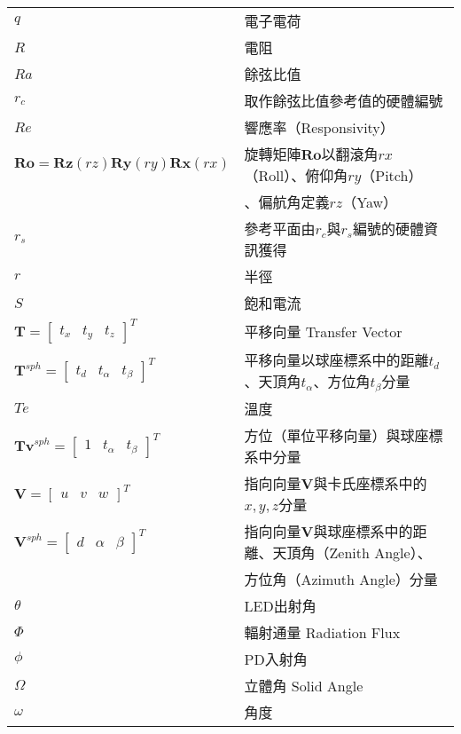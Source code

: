 \begin{longtable}[l]{ll}
    $q$&電子電荷\\

    $R$&電阻\\
    $Ra$& 餘弦比值\\
    $r_c$& 取作餘弦比值參考值的硬體編號\\
    $Re$ & 響應率（Responsivity）\\
    $\boldsymbol{Ro}=\boldsymbol{Rz}(rz)\boldsymbol{Ry}(ry)\boldsymbol{Rx}(rx)$ & 
        旋轉矩陣$\boldsymbol{Ro}$以翻滾角$rx$（Roll）、俯仰角$ry$（Pitch）\\
        & 、偏航角定義$rz$（Yaw）\\%
    $r_s$& 參考平面由$r_c$與$r_s$編號的硬體資訊獲得\\

    $r$ & 半徑\\

    $S$ &飽和電流\\

    $\boldsymbol{T}=\left[\begin{array}{ccc}t_x&t_y&t_z\end{array}\right]^T$ & 平移向量 Transfer Vector\\
    $\boldsymbol{T}^{sph}=\left[\begin{array}{ccc}t_d&t_{\alpha}&t_{\beta}\end{array}\right]^T$ & 平移向量以球座標系中的距離$t_d$、天頂角$t_{\alpha}$、方位角$t_{\beta}$分量\\
    $Te$& 溫度\\
    $\boldsymbol{Tv}^{sph}=\left[\begin{array}{ccc}1&t_{\alpha}&t_{\beta}\end{array}\right]^T$ & 方位（單位平移向量）與球座標系中分量\\


    $\boldsymbol{V} =
        \left[\begin{array}{ccc}
        u &v&w
        \end{array}\right]^T$ & 指向向量$\boldsymbol{V}$與卡氏座標系中的$x,y,z$分量\\
    $\boldsymbol{V}^{sph} =
        \left[\begin{array}{ccc}
        d &\alpha&\beta
        \end{array}\right]^T$ & 指向向量$\boldsymbol{V}$與球座標系中的距離、天頂角（Zenith Angle）、\\
        &方位角（Azimuth Angle）分量\\
   
    $\theta$ & LED出射角\\
    $\Phi$ & 輻射通量 Radiation Flux\\
    $\phi$ & PD入射角\\
    $\Omega$ & 立體角 Solid Angle\\
    $\omega$ & 角度\\
\end{longtable}


